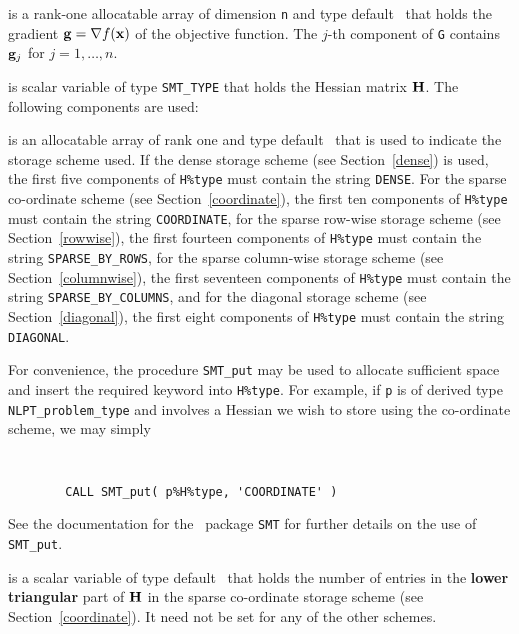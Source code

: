\documentclass{galahad}
\newcommand{\Grad}{\nabla}
\begin{document}
\begin{description}
\begin{description}
 is a rank-one allocatable array of dimension {\tt n} and type
default \realdp\ that holds the gradient $\bmg = \Grad f(\bmx)$
of the objective function.
The $j$-th component of
{\tt G} contains ${\mathbf{g}}_{j}$ for $j = 1, \ldots, n$.

\end{description}

 is scalar variable of type {\tt SMT\_TYPE}
that holds the Hessian matrix ${\mathbf{H}}$. The following components
are used:

\begin{description}

 is an allocatable array of rank one and type default
\character\ that
is used to indicate the storage scheme used. If the dense storage scheme
(see Section~\ref{dense}) is used,
the first five components of {\tt H\%type} must contain the
string {\tt DENSE}.
For the sparse co-ordinate scheme (see Section~\ref{coordinate}),
the first ten components of {\tt H\%type} must contain the
string {\tt COORDINATE},
for the sparse row-wise storage scheme (see Section~\ref{rowwise}),
the first fourteen components of {\tt H\%type} must contain the
string {\tt SPARSE\_BY\_ROWS},
for the sparse column-wise storage scheme (see Section~\ref{columnwise}),
the first seventeen components of {\tt H\%type} must contain the
string {\tt SPARSE\_BY\_COLUMNS},
and for the diagonal storage scheme (see Section~\ref{diagonal}),
the first eight components of {\tt H\%type} must contain the
string {\tt DIAGONAL}.

For convenience, the procedure {\tt SMT\_put}
may be used to allocate sufficient space and insert the required keyword
into {\tt H\%type}.
For example, if {\tt p} is of derived type {\tt NLPT\_problem\_type}
and involves a Hessian we wish to store using the co-ordinate scheme,
we may simply
{\tt
\begin{verbatim}
        CALL SMT_put( p%H%type, 'COORDINATE' )
\end{verbatim}
}
\noindent
See the documentation for the \galahad\ package {\tt SMT}
for further details on the use of {\tt SMT\_put}.

 is a scalar variable of type default \integer\ that
holds the number of entries in the {\bf lower triangular} part of ${\mathbf{H}}$
in the sparse co-ordinate storage scheme (see Section~\ref{coordinate}).
It need not be set for any of the other schemes.


\end{description}
\end{description}
\end{document}
